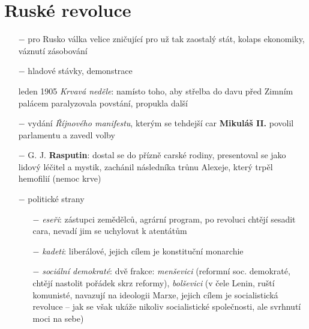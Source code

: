 \documentclass{article}
\begin{document}
\section*{Ruské revoluce}
\begin{itemize}
    \vspace{-0.5em}
    \setlength\itemsep{0.15em}
    \item[$-$] pro Rusko válka velice zničující pro už tak zaostalý stát, kolaps ekonomiky, váznutí zásobování
    \item[$-$] hladové stávky, demonstrace
    \item[leden 1905] \textit{Krvavá neděle}: namísto toho, aby střelba do davu před Zimním palácem paralyzovala povstání, propukla další
    \item[$-$] vydání \textit{Říjnového manifestu}, kterým se tehdejší car \textbf{Mikuláš II.}  povolil parlamentu a zavedl volby
    \item[$-$] G. J. \textbf{Rasputin}: dostal se do přízně carské rodiny, presentoval se jako lidový léčitel a mystik, zachánil následníka trůnu Alexeje, který trpěl hemofilií (nemoc krve)
    \item[$-$] politické strany
    \begin{itemize}
        \vspace{-0.5em}
        \setlength\itemsep{0.15em}
        \item[$-$] \textit{eseři}: zástupci zemědělců, agrární program, po revoluci chtějí sesadit cara, nevadí jim se uchylovat k atentátům
        \item[$-$] \textit{kadeti}: liberálové, jejich cílem je konstituční monarchie
        \item[$-$] \textit{sociální demokraté}: dvě frakce: \textit{menševici} (reformní soc. demokraté, chtějí nastolit pořádek skrz reformy), \textit{bolševici} (v čele Lenin, ruští komunisté, navazují na ideologii Marxe, jejich cílem je socialistická revoluce -- jak se však ukáže nikoliv socialistické společnosti, ale svrhnutí moci na sebe)
    \end{itemize}
\end{itemize}
\end{document}
